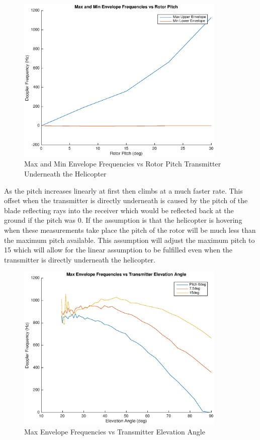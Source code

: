 \begin{figure}
	\begin{center}
		\includegraphics[width=10cm]{images/simulation/pitch_0txPos_max_doppler.eps}
		\caption{Max and Min Envelope Frequencies vs Rotor Pitch Transmitter Underneath the Helicopter}
		\label{fig:pitch_tx0}
	\end{center}
\end{figure}

As the pitch increases linearly at first then climbs at a much faster rate. This offset when the transmitter is directly underneath is caused by the pitch of the blade reflecting rays into the receiver which would be reflected back at the ground if the pitch was 0\textdegree. If the assumption is that the helicopter is hovering when these measurements take place the pitch of the rotor will be much less than the maximum pitch available. This assumption will adjust the maximum pitch to 15 \textdegree \space which will allow for the linear assumption to be fulfilled even when the transmitter is directly underneath the helicopter.

\begin{figure}
	\begin{center}
		\includegraphics[width=10cm]{images/simulation/elevation_angle_with_pitch_max_doppler.eps}
		\caption{Max Envelope Frequencies vs Transmitter Elevation Angle}
		\label{fig:pitch_tx_elevation_angle}
	\end{center}
\end{figure}

